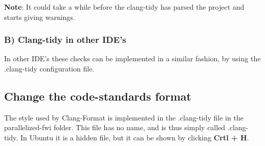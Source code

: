 \documentclass[10pt]{article}
\begin{document}
\textbf{Note}: It could take a while before the clang-tidy has parsed the project and starts giving warnings.

\subsubsection*{B) Clang-tidy in other IDE's}
In other IDE’s these checks can be implemented in a similar fashion, by using the .clang-tidy configuration file.

\subsection*{Change the code-standards format}
The style used by Clang-Format is implemented in the .clang-tidy file in the parallelized-fwi folder. This file has no name, and is thus simply called .clang-tidy. In Ubuntu it is a hidden file, but it can be shown by clicking \textbf{Crtl + H}.
\end{document}
